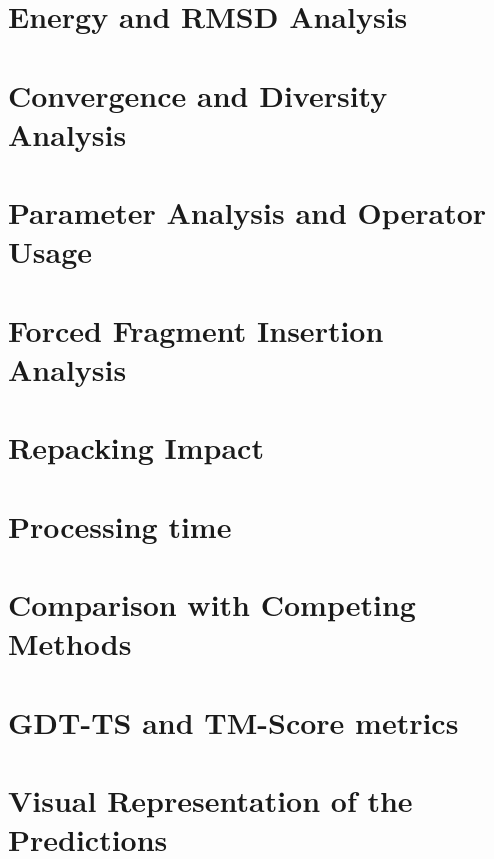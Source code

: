 \section{Energy and \ac{RMSD} Analysis}\label{sec:methods-analysis}







\section{Convergence and Diversity Analysis}

\section{Parameter Analysis and Operator Usage}

\section{Forced Fragment Insertion Analysis}

\section{Repacking Impact}

\section{Processing time}

\section{Comparison with Competing Methods}

\section{GDT-TS and TM-Score metrics}

\section{Visual Representation of the Predictions}

